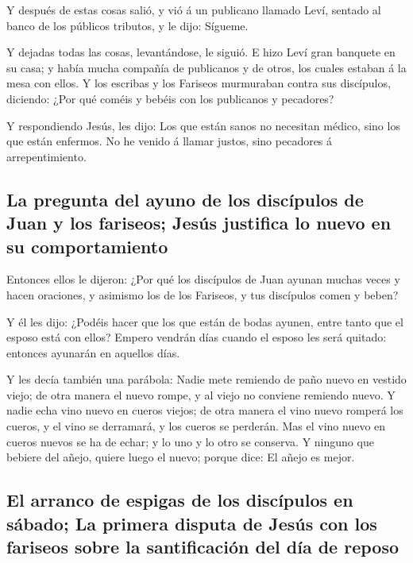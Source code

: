  Y después de estas cosas salió, y vió á un publicano
llamado Leví, sentado al banco de los públicos tributos, y le dijo:
Sígueme.

 Y dejadas todas las cosas, levantándose, le siguió.
 E hizo Leví gran banquete en su casa; y había mucha
compañía de publicanos y de otros, los cuales estaban á la mesa con
ellos.  Y los escribas y los Fariseos murmuraban contra sus
discípulos, diciendo: ¿Por qué coméis y bebéis con los publicanos y
pecadores?

 Y respondiendo Jesús, les dijo: Los que están sanos no
necesitan médico, sino los que están enfermos.  No he
venido á llamar justos, sino pecadores á arrepentimiento.

\hypertarget{la-pregunta-del-ayuno-de-los-discuxedpulos-de-juan-y-los-fariseos-jesuxfas-justifica-lo-nuevo-en-su-comportamiento}{%
\subsection{La pregunta del ayuno de los discípulos de Juan y los
fariseos; Jesús justifica lo nuevo en su
comportamiento}\label{la-pregunta-del-ayuno-de-los-discuxedpulos-de-juan-y-los-fariseos-jesuxfas-justifica-lo-nuevo-en-su-comportamiento}}

 Entonces ellos le dijeron: ¿Por qué los discípulos de Juan
ayunan muchas veces y hacen oraciones, y asimismo los de los Fariseos, y
tus discípulos comen y beben?

 Y él les dijo: ¿Podéis hacer que los que están de bodas
ayunen, entre tanto que el esposo está con ellos?  Empero
vendrán días cuando el esposo les será quitado: entonces ayunarán en
aquellos días.

 Y les decía también una parábola: Nadie mete remiendo de
paño nuevo en vestido viejo; de otra manera el nuevo rompe, y al viejo
no conviene remiendo nuevo.  Y nadie echa vino nuevo en
cueros viejos; de otra manera el vino nuevo romperá los cueros, y el
vino se derramará, y los cueros se perderán.  Mas el vino
nuevo en cueros nuevos se ha de echar; y lo uno y lo otro se conserva.
 Y ninguno que bebiere del añejo, quiere luego el nuevo;
porque dice: El añejo es mejor.

\hypertarget{el-arranco-de-espigas-de-los-discuxedpulos-en-suxe1bado-la-primera-disputa-de-jesuxfas-con-los-fariseos-sobre-la-santificaciuxf3n-del-duxeda-de-reposo}{%
\subsection{El arranco de espigas de los discípulos en sábado; La
primera disputa de Jesús con los fariseos sobre la santificación del día
de
reposo}\label{el-arranco-de-espigas-de-los-discuxedpulos-en-suxe1bado-la-primera-disputa-de-jesuxfas-con-los-fariseos-sobre-la-santificaciuxf3n-del-duxeda-de-reposo}}

